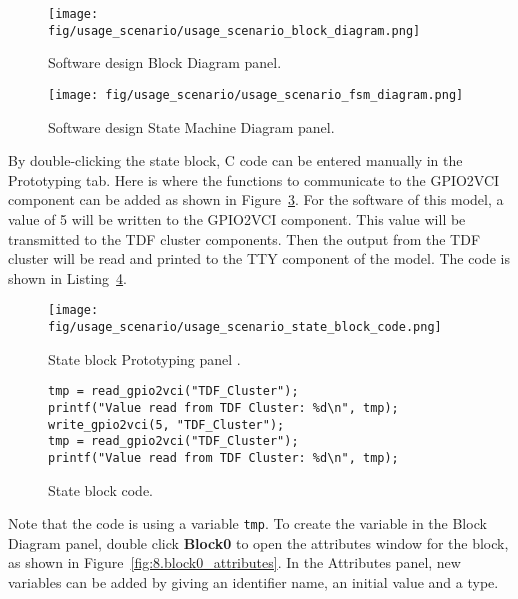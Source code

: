 \begin{figure}[h]
    \centering
    \texttt{[image: fig/usage\_scenario/usage\_scenario\_block\_diagram.png]}
    \caption{Software design Block Diagram panel.}
    \label{fig:8.usage_scenario_block_diagram}
\end{figure}

\begin{figure}[h]
    \centering
    \texttt{[image: fig/usage\_scenario/usage\_scenario\_fsm\_diagram.png]}
    \caption{Software design State Machine Diagram panel.}
    \label{fig:8.usage_scenario_fsm_diagram}
\end{figure}

By double-clicking the state block, C code can be entered manually in the Prototyping tab. Here is where the functions to communicate to the GPIO2VCI component can be added as shown in Figure~\ref{fig:8.usage_scenario_state_block_code}. For the software of this model, a value of 5 will be written to the GPIO2VCI component. This value will be transmitted to the TDF cluster components. Then the output from the TDF cluster will be read and printed to the TTY component of the model. The code is shown in Listing~\ref{code:8.usage_scenario_state_block_code}. 


\begin{figure}[htb]
    \centering
    \texttt{[image: fig/usage\_scenario/usage\_scenario\_state\_block\_code.png]}
    \caption{State block Prototyping panel .}
    \label{fig:8.usage_scenario_state_block_code}
\end{figure}

\begin{figure}[htb]
\begin{verbatim}
tmp = read_gpio2vci("TDF_Cluster");
printf("Value read from TDF Cluster: %d\n", tmp);
write_gpio2vci(5, "TDF_Cluster");
tmp = read_gpio2vci("TDF_Cluster");
printf("Value read from TDF Cluster: %d\n", tmp);
\end{verbatim}
  \caption{State block code.}
  \label{code:8.usage_scenario_state_block_code}
\end{figure}

Note that the code is using a variable \texttt{tmp}. To create the variable in the Block Diagram panel, double click \textbf{Block0} to open the attributes window for the block, as shown in Figure~\ref{fig:8.block0_attributes}. In the Attributes panel, new variables can be added by giving an identifier name, an initial value and a type.

